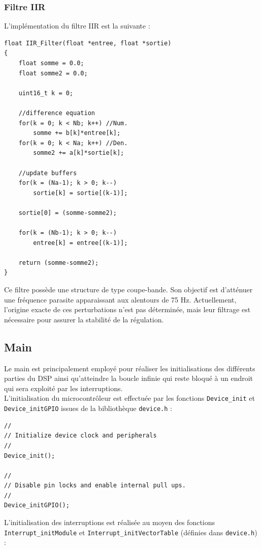 \subsubsection{Filtre IIR}
L'implémentation du filtre IIR est la suivante :

\begin{verbatim}
float IIR_Filter(float *entree, float *sortie)
{
    float somme = 0.0;
    float somme2 = 0.0;

    uint16_t k = 0;

    //difference equation
    for(k = 0; k < Nb; k++) //Num.
        somme += b[k]*entree[k];
    for(k = 0; k < Na; k++) //Den.
        somme2 += a[k]*sortie[k];

    //update buffers
    for(k = (Na-1); k > 0; k--)
        sortie[k] = sortie[(k-1)];

    sortie[0] = (somme-somme2);

    for(k = (Nb-1); k > 0; k--)
        entree[k] = entree[(k-1)];

    return (somme-somme2);
}
\end{verbatim}

Ce filtre possède une structure de type coupe-bande. Son objectif est d'atténuer une fréquence parasite apparaissant aux alentours de 75 Hz. Actuellement, l'origine exacte de ces perturbations n'est pas déterminée, mais leur filtrage est nécessaire pour assurer la stabilité de la régulation.

\subsection{Main}
Le main est principalement employé pour réaliser les initialisations des différents parties du DSP ainsi qu'atteindre la boucle infinie qui reste bloqué à un endroit qui sera exploité par les interruptions.\\

L'initialisation du microcontrôleur est effectuée par les fonctions \texttt{Device\_init} et \texttt{Device\_initGPIO} issues de la bibliothèque \texttt{device.h} :

\begin{verbatim}
//
// Initialize device clock and peripherals
//
Device_init();

//
// Disable pin locks and enable internal pull ups.
//
Device_initGPIO();
\end{verbatim}

L'initialisation des interruptions est réalisée au moyen des fonctions \texttt{Interrupt\_initModule} et \texttt{Interrupt\_initVectorTable} (définies dans \texttt{device.h}) :

